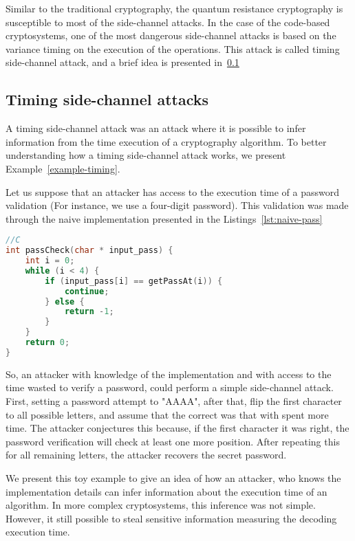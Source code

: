 Similar to the traditional cryptography, the quantum resistance cryptography is susceptible to most of the side-channel attacks. In the case of the code-based cryptosystems, one of the most dangerous side-channel attacks is based on the variance timing on the execution of the operations. This attack is called timing side-channel attack, and a brief idea is presented in~\ref{sub:timing-attack}

\subsection{Timing side-channel attacks}\label{sub:timing-attack}
A timing side-channel attack was an attack where it is possible to infer information from the time execution of a cryptography algorithm. To better understanding how a timing side-channel attack works, we present Example~\ref{example-timing}. 

\begin{example}\label{example-timing}
Let us suppose that an attacker has access to the execution time of a password validation (For instance, we use a four-digit password). This validation was made through the naive implementation presented in the Listings~\ref{lst:naive-pass}

\begin{lstlisting}[caption={Naive implementation of password check },label={lst:naive-pass},language=C]
//C
int passCheck(char * input_pass) {
    int i = 0;
    while (i < 4) {
        if (input_pass[i] == getPassAt(i)) {
            continue;
        } else {
            return -1;
        }
    }
    return 0;
}
\end{lstlisting}
So, an attacker with knowledge of the implementation and with access to the time wasted to verify a password, could perform a simple side-channel attack. First, setting a password attempt to "AAAA", after that, flip the first character to all possible letters, and assume that the correct was that with spent more time. The attacker conjectures this because, if the first character it was right, the password verification will check at least one more position. After repeating this for all remaining letters, the attacker recovers the secret password.
\end{example}

We present this toy example to give an idea of how an attacker, who knows the implementation details can infer information about the execution time of an algorithm. In more complex cryptosystems, this inference was not simple. However, it still possible to steal sensitive information measuring the decoding execution time.

